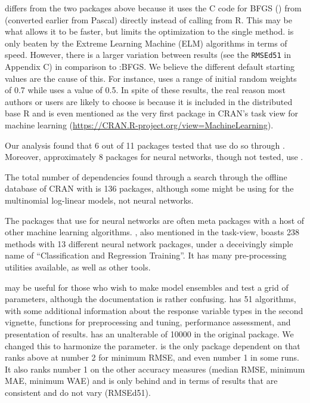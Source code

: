  \citep{R-nnet} differs from the two packages above
because it uses the \textsf{C} code for BFGS () from
 (converted earlier from Pascal) directly instead of calling
 from \textsf{R}. This may be what allows it to be faster,
but limits the optimization to the single method.  is only
beaten by the Extreme Learning Machine (ELM) algorithms in terms of
speed. However, there is a larger variation between results (see the
\texttt{RMSEd51} in Appendix C) in comparison to
:BFGS. We believe the different default starting
values are the cause of this. For instance,  uses a range
of initial random weights of 0.7 while  uses a value
of 0.5. In spite of these results, the real reason most authors or users
are likely to choose  is because it is included in the
distributed base \textsf{R} and is even mentioned as the very first
package in CRAN's task view for machine learning
(\url{https://CRAN.R-project.org/view=MachineLearning}).

Our analysis found that 6 out of 11 packages tested that use
 do so through . Moreover, approximately 8
packages for neural networks, though not tested, use .

The total number of  dependencies found through a search
through the offline database of CRAN with  is 136
packages, although some might be using  for the
multinomial log-linear models, not neural networks.

The packages that use  for neural networks are often meta
packages with a host of other machine learning algorithms.
 \citep{R-caret}, also mentioned in the task-view, boasts
238 methods with 13 different neural network packages, under a
deceivingly simple name of ``Classification and Regression Training''.
It has many pre-processing utilities available, as well as other tools.

 \citep{R-EnsembleBase} may be useful for those
who wish to make model ensembles and test a grid of parameters, although
the documentation is rather confusing. 
\citep{R-MachineShop} has 51 algorithms, with some additional
information about the response variable types in the second vignette,
functions for preprocessing and tuning, performance assessment, and
presentation of results.  \citep{R-radiant.model}
has an unalterable  of 10000 in the original package. We
changed this to harmonize the  parameter. 
\citep{R-rminer} is the only package dependent on  that
ranks above  at number 2 for minimum RMSE, and even number
1 in some runs. It also ranks number 1 on the other accuracy measures
(median RMSE, minimum MAE, minimum WAE) and is only behind
 and  in terms of results that are
consistent and do not vary (RMSEd51).

